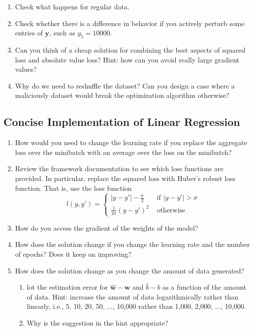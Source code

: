 \documentclass{article}
\begin{document}
\begin{enumerate}
\item Check what happens for regular data.

\item Check whether there is a difference in behavior if you actively perturb some entries of $\mathbf{y}$, such as $y_5 = 10000$.

\item Can you think of a cheap solution for combining the best aspects of squared loss and absolute value loss? Hint: how can you avoid really large gradient values?

\item Why do we need to reshuffle the dataset? Can you design a case where a maliciously dataset would break the optimization algorithm otherwise?
\end{enumerate}

\subsection{Concise Implementation of Linear Regression}
\begin{enumerate}
\item How would you need to change the learning rate if you replace the aggregate loss over the minibatch with an average over the loss on the minibatch?
\item Review the framework documentation to see which loss functions are provided. In particular, replace the squared loss with Huber’s robust loss function. That is, use the loss function
$$
l(y,y') = \begin{cases}
|y-y'| -\frac{\sigma}{2} & \text{ if } |y-y'| > \sigma \\
\frac{1}{2 \sigma} (y-y')^2 & \text{ otherwise}
\end{cases}
$$
\item How do you access the gradient of the weights of the model?
\item How does the solution change if you change the learning rate and the number of epochs? Does it keep on improving?
\item How does the solution change as you change the amount of data generated? 
	\begin{enumerate}
		\item lot the estimation error for $\hat{\mathbf{w}} - \mathbf{w}$ and $\hat{b} - b$ as a function of the amount of data. Hint: increase the amount of data logarithmically rather than linearly, i.e., 5, 10, 20, 50, ..., 10,000 rather than 1,000, 2,000, ..., 10,000.
		\item Why is the suggestion in the hint appropriate?
	\end{enumerate}
\end{enumerate}
\end{document}

